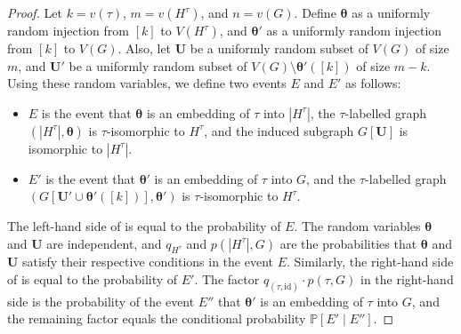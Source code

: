 \documentclass{article}
\begin{document}
\begin{proof}
  Let $k = v(\tau)$, $m = v(H^\tau)$, and $n = v(G)$. Define $\boldsymbol{\theta}$ as a uniformly random injection from $[k]$ to $V(H^\tau)$, and  $\boldsymbol{\theta}'$ as a uniformly random injection from $[k]$ to $V(G)$. Also, let $\mathbf{U}$ be a uniformly random subset of $V(G)$ of size $m$, and $\mathbf{U}'$ be a uniformly random subset of $V(G) \setminus \boldsymbol{\theta}'([k])$ of size $m-k$. Using these random variables, we define two events $E$ and $E'$ as follows:
    \begin{itemize}
      \item $E$ is the event that $\boldsymbol{\theta}$ is an embedding of $\tau$ into $|H^\tau|$, the $\tau$-labelled graph $(|H^\tau|, \boldsymbol{\theta})$ is $\tau$-isomorphic to $H^\tau$, and the induced subgraph $G[\mathbf{U}]$ is isomorphic to $|H^\tau|$.
      \item $E'$ is the event that $\boldsymbol{\theta}'$ is an embedding of $\tau$ into $G$, and the $\tau$-labelled graph $(G[\mathbf{U}' \cup \boldsymbol{\theta}'([k])],\boldsymbol{\theta}')$ is $\tau$-isomorphic to $H^\tau$.
    \end{itemize}

  The left-hand side of  is equal to the probability of $E$. The random variables $\boldsymbol{\theta}$ and $\mathbf{U}$ are independent, and $q_{H^\tau}$ and $p(|H^\tau|,G)$ are the probabilities that $\boldsymbol{\theta}$ and $\mathbf{U}$ satisfy their respective conditions in the event $E$. Similarly, the right-hand side of  is equal to the probability of $E'$. The factor $q_{(\tau ,\mathrm{id})} \cdot p(\tau,G)$ in the right-hand side is the probability of the event $E''$ that $\boldsymbol{\theta}'$ is an embedding of $\tau$ into $G$, and the remaining factor equals the conditional probability $\mathbb{P}[E' \mid E'']$.  
  

\end{proof}
\end{document}
